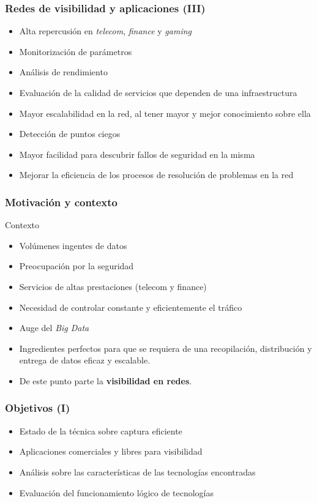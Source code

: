 \documentclass{beamer}
\begin{document}
\begin{frame}
\frametitle{Redes de visibilidad y aplicaciones (III)}

\begin{itemize}
\item Alta repercusión en \textit{telecom}, \textit{finance} y \textit{gaming}
\item Monitorización de parámetros
\item Análisis de rendimiento
\item Evaluación de la calidad de servicios que dependen de una infraestructura
\item Mayor escalabilidad en la red, al tener mayor y mejor conocimiento sobre ella
\item Detección de puntos ciegos
\item Mayor facilidad para descubrir fallos de seguridad en la misma
\item Mejorar la eficiencia de los procesos de resolución de problemas en la red
\end{itemize}

\end{frame}



\begin{frame}
\frametitle{Motivación y contexto}
\begin{block}{Contexto}
\begin{itemize}
	\item Volúmenes ingentes de datos
	\item Preocupación por la seguridad
	\item Servicios de altas prestaciones (telecom y finance)
	\item Necesidad de controlar constante y eficientemente el tráfico
	\item Auge del \textit{Big Data}
\end{itemize}
\end{block}

\begin{itemize}
	\item Ingredientes perfectos para que se requiera de una recopilación, distribución y entrega de datos eficaz y escalable.
	\item De este punto parte la \textbf{visibilidad en redes}.
\end{itemize}

\end{frame}

\begin{frame}
\frametitle{Objetivos (I)}

\begin{itemize}
	\item Estado de la técnica sobre captura eficiente
	\item Aplicaciones comerciales y libres para visibilidad
	\item Análisis sobre las características de las tecnologías encontradas
	\item Evaluación del funcionamiento lógico de tecnologías
\end{itemize}

\end{frame}
\end{document}
